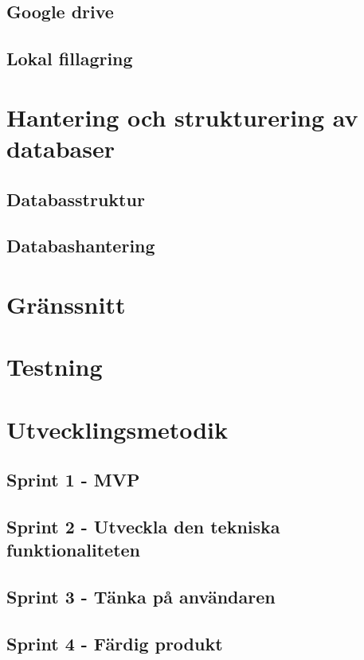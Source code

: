 \documentclass[a4paper,12pt,oneside,final]{extbook}
\begin{document}
\subsection{Google drive}

\subsection{Lokal fillagring}

\section{Hantering och strukturering av databaser}

\subsection{Databasstruktur}

\subsection{Databashantering}

\section{Gränssnitt}

\section{Testning}

\section{Utvecklingsmetodik}

\subsection{Sprint 1 - MVP}

\subsection{Sprint 2 - Utveckla den tekniska funktionaliteten}

\subsection{Sprint 3 - Tänka på användaren}

\subsection{Sprint 4 - Färdig produkt}
\end{document}
